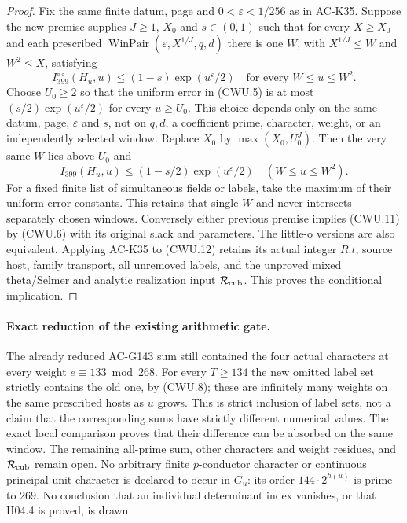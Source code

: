 \begin{proof}
Fix the same finite datum, page and $0<\varepsilon<1/256$ as in
AC-K35.  Suppose the new premise supplies $J\geq1$, $X_0$ and
$s\in(0,1)$ such that for every $X\geq X_0$ and each prescribed
$\operatorname{WinPair}(\varepsilon,X^{1/J},q,d)$ there is one
$W$, with $X^{1/J}\leq W$ and $W^2\leq X$, satisfying
\[
 I_{399}^{\circ\circ}(H_u,u)
          \leq(1-s)\exp(u^\varepsilon/2)
                  \quad\text{for every }W\leq u\leq W^2.
 \tag{CWU.11}
\]
Choose $U_0\geq2$ so that the uniform error in (CWU.5) is at most
$(s/2)\exp(u^\varepsilon/2)$ for every $u\geq U_0$.
This choice depends only on the same datum, page, $\varepsilon$
and $s$, not on $q,d$, a coefficient prime, character, weight,
or an independently selected window.  Replace $X_0$ by
$\max(X_0,U_0^J)$.  Then the very same $W$ lies above $U_0$ and
\[
 I_{399}(H_u,u)\leq(1-s/2)\exp(u^\varepsilon/2)
                       \quad(W\leq u\leq W^2).
 \tag{CWU.12}
\]
For a fixed finite list of simultaneous fields or labels, take the
maximum of their uniform error constants.  This retains that single
$W$ and never intersects separately chosen windows.
Conversely either previous premise implies (CWU.11) by (CWU.6)
with its original slack and parameters.  The little-o versions are
also equivalent.  Applying AC-K35 to (CWU.12) retains its actual
integer $R.t$, source host, family transport, all unremoved labels,
and the unproved mixed theta/Selmer and analytic realization input
$\mathcal R_{\rm cub}$.  This proves the conditional implication.
\end{proof}

\paragraph{Exact reduction of the existing arithmetic gate.}
The already reduced AC-G143 sum still contained the four actual
characters at every weight $e\equiv133\bmod268$.
For every $T\geq134$ the new omitted label set strictly contains
the old one, by (CWU.8); these are infinitely many weights on the
same prescribed hosts as $u$ grows.  This is strict inclusion of
label sets, not a claim that the corresponding sums have strictly
different numerical values.  The exact local comparison proves
that their difference can be absorbed on the same window.
The remaining all-prime sum, other characters and weight residues,
and $\mathcal R_{\rm cub}$ remain open.  No arbitrary finite
$p$-conductor character or continuous principal-unit character is
declared to occur in $G_u$: its order $144\cdot2^{h(u)}$ is prime
to $269$.  No conclusion that an individual determinant index
vanishes, or that H04.4 is proved, is drawn.

